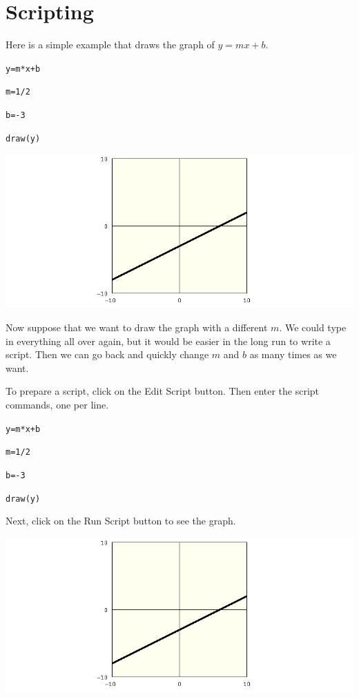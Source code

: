 
\newpage

\chapter{Scripting}

\noindent
Here is a simple example that draws the graph of $y=mx+b$.

\medskip
{\tt y=m*x+b}

{\tt m=1/2}

{\tt b=-3}

{\tt draw(y)}

\medskip
\noindent
\includegraphics[scale=0.5]{1.png}

\newpage

\noindent
Now suppose that we want to draw the graph
with a different $m$.
We could type in everything all over again, but it would be easier
in the long run to write a script.
Then we can go back and quickly change $m$ and $b$ as many times as we want.

\medskip
\noindent
To prepare a script, click on the Edit Script button.
Then enter the script commands, one per line.

\medskip
{\tt y=m*x+b}

{\tt m=1/2}

{\tt b=-3}

{\tt draw(y)}

\medskip
\noindent
Next, click on the Run Script button to see the graph.

\medskip
\noindent
\includegraphics[scale=0.5]{1.png}


